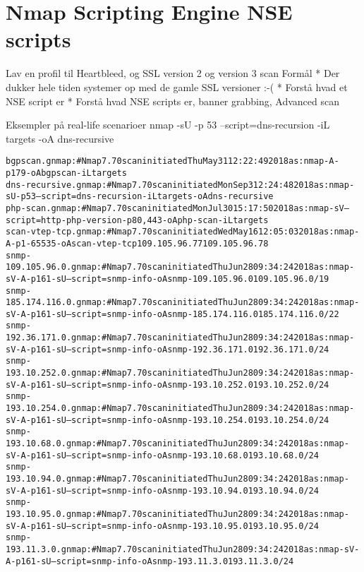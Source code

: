 \documentclass[a4paper,11pt,notitlepage]{report}
\begin{document}
\chapter{Nmap Scripting Engine NSE scripts}

Lav en profil til Heartbleed, og SSL version 2 og version 3 scan
Formål
* Der dukker hele tiden systemer op med de gamle SSL versioner :-(
* Forstå hvad et NSE script er
* Forstå hvad NSE scripts er, banner grabbing, Advanced scan

Eksempler på real-life scenarioer
 nmap -sU -p 53 --script=dns-recursion -iL targets -oA dns-recursive

\begin{alltt}
bgpscan.gnmap:# Nmap 7.70 scan initiated Thu May 31 12:22:49 2018 as: nmap -A -p 179 -oA bgpscan -iL targets
dns-recursive.gnmap:# Nmap 7.70 scan initiated Mon Sep  3 12:24:48 2018 as: nmap -sU -p 53 --script=dns-recursion -iL targets -oA dns-recursive
php-scan.gnmap:# Nmap 7.70 scan initiated Mon Jul 30 15:17:50 2018 as: nmap -sV --script=http-php-version -p80,443 -oA php-scan -iL targets
scan-vtep-tcp.gnmap:# Nmap 7.70 scan initiated Wed May 16 12:05:03 2018 as: nmap -A -p 1-65535 -oA scan-vtep-tcp 109.105.96.77 109.105.96.78
snmp-109.105.96.0.gnmap:# Nmap 7.70 scan initiated Thu Jun 28 09:34:24 2018 as: nmap -sV -A -p 161 -sU --script=snmp-info -oA snmp-109.105.96.0 109.105.96.0/19
snmp-185.174.116.0.gnmap:# Nmap 7.70 scan initiated Thu Jun 28 09:34:24 2018 as: nmap -sV -A -p 161 -sU --script=snmp-info -oA snmp-185.174.116.0 185.174.116.0/22
snmp-192.36.171.0.gnmap:# Nmap 7.70 scan initiated Thu Jun 28 09:34:24 2018 as: nmap -sV -A -p 161 -sU --script=snmp-info -oA snmp-192.36.171.0 192.36.171.0/24
snmp-193.10.252.0.gnmap:# Nmap 7.70 scan initiated Thu Jun 28 09:34:24 2018 as: nmap -sV -A -p 161 -sU --script=snmp-info -oA snmp-193.10.252.0 193.10.252.0/24
snmp-193.10.254.0.gnmap:# Nmap 7.70 scan initiated Thu Jun 28 09:34:24 2018 as: nmap -sV -A -p 161 -sU --script=snmp-info -oA snmp-193.10.254.0 193.10.254.0/24
snmp-193.10.68.0.gnmap:# Nmap 7.70 scan initiated Thu Jun 28 09:34:24 2018 as: nmap -sV -A -p 161 -sU --script=snmp-info -oA snmp-193.10.68.0 193.10.68.0/24
snmp-193.10.94.0.gnmap:# Nmap 7.70 scan initiated Thu Jun 28 09:34:24 2018 as: nmap -sV -A -p 161 -sU --script=snmp-info -oA snmp-193.10.94.0 193.10.94.0/24
snmp-193.10.95.0.gnmap:# Nmap 7.70 scan initiated Thu Jun 28 09:34:24 2018 as: nmap -sV -A -p 161 -sU --script=snmp-info -oA snmp-193.10.95.0 193.10.95.0/24
snmp-193.11.3.0.gnmap:# Nmap 7.70 scan initiated Thu Jun 28 09:34:24 2018 as: nmap -sV -A -p 161 -sU --script=snmp-info -oA snmp-193.11.3.0 193.11.3.0/24

\end{alltt}
\end{document}
